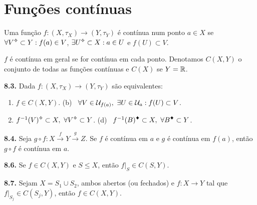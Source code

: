 \section{Funções contínuas}

\begin{definition}
    Uma função \(f: (X,\tau_X) \to (Y, \tau_Y) \) é contínua num ponto \(a \in X\) se \(\forall V\ab \subset Y : f(a) \in V\), \(\exists U\ab\subset X : a \in U\) e \(f(U)\subset V\).
\end{definition}

\begin{note}
    \(f\) é contínua em geral se for contínua em cada ponto. Denotamos \(C(X,Y)\) o conjunto de todas as funções contínuas  e \(C(X)\) se \(Y = \mathbb{R}\).
\end{note}

\begin{proposition}
    \textbf{8.3.} Dada \(f : (X, \tau_X) \to (Y, \tau_Y)\) são equivalentes:
    \vspace{-0.3cm}
    \begin{enumerate}[label =(\alph*), left = 0.6cm]
        \item \(f\in C(X,Y)\). \hspace{3.9cm} (b) \ \(\forall V \in \mathcal{U}_{f(a)}, \ \exists U \in \mathcal{U}_a : f(U) \subset V\). 
        \item[(c)] \(f^{-1}(V)\ab \subset X, \ \forall V\ab\subset Y \). \hspace{1.3cm} (d) \ \(f^{-1}(B)\ce \subset X, \ \forall B\ce\subset Y \).
    \end{enumerate}
\end{proposition}

\begin{proposition}
    \textbf{8.4.} Seja \(g \circ f: X \overset{f}{\longrightarrow} Y \overset{g}{\longrightarrow} Z\). Se \(f\) é contínua em \(a\) e \(g\) é contínua em \(f(a)\), então \(g \circ f\) é contínua em \(a\). 
\end{proposition}

\begin{proposition}
    \textbf{8.6.} Se \(f \in C(X,Y)\) e \(S \leq X\), então \(f|_S \in C(S, Y)\). 
\end{proposition}

\begin{proposition}
    \textbf{8.7.} Sejam \(X = S_1 \cup S_2\), ambos abertos (ou fechados) e \(f:X \to Y\) tal que \( f|_{S_j}\in C(S_j,Y)\), então \(f \in C(X,Y)\). 
\end{proposition}

